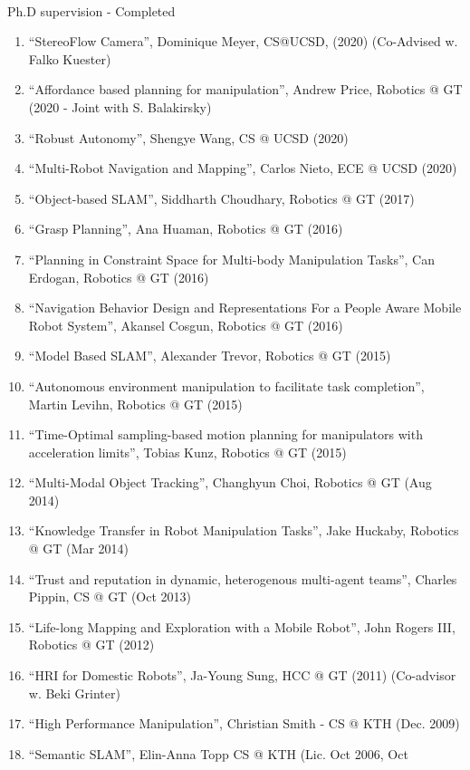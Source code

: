 \documentclass{article}
\begin{document}
\begin{cv}
\begin{cvlist}{~}
\item[Ph.D supervision - Completed]\ \\
  \begin{enumerate}
  \item ``StereoFlow Camera'', Dominique Meyer, CS@UCSD, (2020)
    (Co-Advised w. Falko Kuester)
  \item ``Affordance based planning for manipulation'', Andrew Price,
    Robotics @ GT (2020 - Joint with S. Balakirsky)
  \item ``Robust Autonomy'', Shengye Wang, CS @ UCSD (2020)
  \item ``Multi-Robot Navigation and Mapping'', Carlos Nieto, ECE @ UCSD (2020)
  \item ``Object-based SLAM'', Siddharth Choudhary, Robotics @ GT (2017)
  \item ``Grasp Planning'', Ana Huaman, Robotics @ GT (2016)
  \item ``Planning in Constraint Space for Multi-body Manipulation
    Tasks'', Can Erdogan, Robotics @ GT (2016)
  \item ``Navigation Behavior Design and Representations For a People
    Aware Mobile Robot System'', Akansel Cosgun, Robotics @ GT (2016)
  \item ``Model Based SLAM'', Alexander Trevor, Robotics @ GT (2015)
  \item ``Autonomous environment manipulation to facilitate task
    completion'', Martin Levihn, Robotics @ GT (2015)
  \item ``Time-Optimal sampling-based motion planning for manipulators
    with acceleration limits'', Tobias Kunz, Robotics @ GT (2015)
  \item ``Multi-Modal Object Tracking'', Changhyun Choi, Robotics @ GT
    (Aug 2014)
  \item ``Knowledge Transfer in Robot Manipulation Tasks'', Jake
    Huckaby, Robotics @ GT (Mar 2014)
  \item ``Trust and reputation in dynamic, heterogenous multi-agent
    teams'', Charles Pippin, CS @ GT (Oct 2013)
  \item ``Life-long Mapping and Exploration with a Mobile Robot'',
    John Rogers III, Robotics @ GT (2012)
  \item ``HRI for Domestic Robots'', Ja-Young Sung, HCC @ GT (2011)
    (Co-advisor w. Beki Grinter)
  \item ``High Performance Manipulation'', Christian Smith - CS @ KTH
    (Dec. 2009)
  \item ``Semantic SLAM'', Elin-Anna Topp CS @ KTH (Lic. Oct 2006, Oct

\end{enumerate}
\end{cvlist}
\end{cv}
\end{document}
